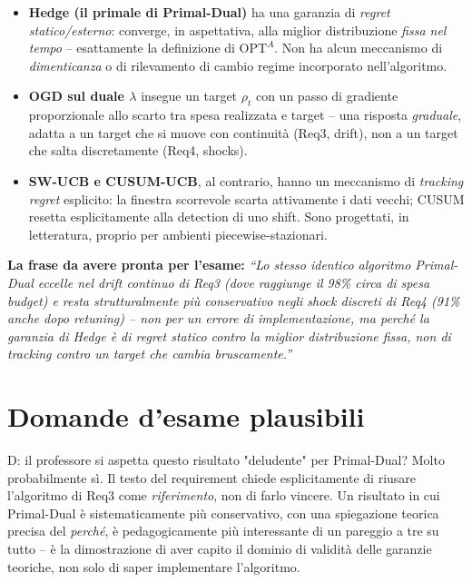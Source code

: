 \documentclass[11pt]{article}
\begin{document}
\begin{itemize}
\item \textbf{Hedge (il primale di Primal-Dual)} ha una garanzia di \emph{regret statico/esterno}: converge, in aspettativa, alla miglior distribuzione \emph{fissa nel tempo} -- esattamente la definizione di $\text{OPT}^A$. Non ha alcun meccanismo di \emph{dimenticanza} o di rilevamento di cambio regime incorporato nell'algoritmo.
\item \textbf{OGD sul duale $\lambda$} insegue un target $\rho_t$ con un passo di gradiente proporzionale allo scarto tra spesa realizzata e target -- una risposta \emph{graduale}, adatta a un target che si muove con continuità (Req3, drift), non a un target che salta discretamente (Req4, shocks).
\item \textbf{SW-UCB e CUSUM-UCB}, al contrario, hanno un meccanismo di \emph{tracking regret} esplicito: la finestra scorrevole scarta attivamente i dati vecchi; CUSUM resetta esplicitamente alla detection di uno shift. Sono progettati, in letteratura, proprio per ambienti piecewise-stazionari.
\end{itemize}

\begin{keybox}
\textbf{La frase da avere pronta per l'esame:} \emph{``Lo stesso identico algoritmo Primal-Dual eccelle nel drift continuo di Req3 (dove raggiunge il 98\% circa di spesa budget) e resta strutturalmente più conservativo negli shock discreti di Req4 (91\% anche dopo retuning) -- non per un errore di implementazione, ma perché la garanzia di Hedge è di regret statico contro la miglior distribuzione fissa, non di tracking contro un target che cambia bruscamente.''}
\end{keybox}

\section{Domande d'esame plausibili}

\begin{qabox}{D: il professore si aspetta questo risultato "deludente" per Primal-Dual?}
Molto probabilmente sì. Il testo del requirement chiede esplicitamente di riusare l'algoritmo di Req3 come \emph{riferimento}, non di farlo vincere. Un risultato in cui Primal-Dual è sistematicamente più conservativo, con una spiegazione teorica precisa del \emph{perché}, è pedagogicamente più interessante di un pareggio a tre su tutto -- è la dimostrazione di aver capito il dominio di validità delle garanzie teoriche, non solo di saper implementare l'algoritmo.
\end{qabox}
\end{document}
